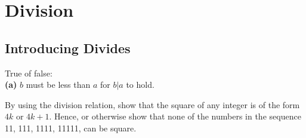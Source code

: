 
\chapter{Division}


\section{Introducing Divides}



\begin{example}
True of false: \\
\textbf{(a)} $b$ must be less than $a$ for $b | a$ to hold. 
\end{example}











\frmrule

\begin{example}
By using the division relation, show that the square of any integer 
is of the form $4k$ or $4k+1$. Hence, or otherwise show that 
none of the numbers in the sequence 11, 111, 1111, 11111, can be square.
\end{example}
